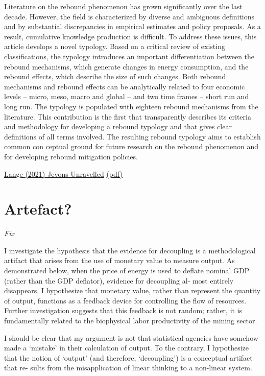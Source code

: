 \documentclass[
]{book}
\begin{document}
Literature on the rebound phenomenon has grown significantly over the last decade. However, the field is
characterized by diverse and ambiguous definitions and by substantial discrepancies in empirical estimates and
policy proposals. As a result, cumulative knowledge production is difficult. To address these issues, this article
develops a novel typology. Based on a critical review of existing classifications, the typology introduces an
important differentiation between the rebound mechanisms, which generate changes in energy consumption, and
the rebound effects, which describe the size of such changes. Both rebound mechanisms and rebound effects can
be analytically related to four economic levels -- micro, meso, macro and global -- and two time frames -- short run
and long run. The typology is populated with eighteen rebound mechanisms from the literature. This contribution
is the first that transparently describes its criteria and methodology for developing a rebound typology and that
gives clear definitions of all terms involved. The resulting rebound typology aims to establish common con­
ceptual ground for future research on the rebound phenomenon and for developing rebound mitigation policies.

\href{https://www.sciencedirect.com/science/article/pii/S221462962100075X}{Lange (2021) Jevons Unravelled}
\href{pdf/Lange_2021_Jevons_Unravelled.pdf}{(pdf)}

\hypertarget{artefact}{%
\section{Artefact?}\label{artefact}}

\emph{Fix}

I investigate the hypothesis that the evidence for
decoupling is a methodological artifact that arises from the use of monetary value
to measure output. As demonstrated below, when the price of energy is used to
deflate nominal GDP (rather than the GDP deflator), evidence for decoupling al-
most entirely disappears. I hypothesize that monetary value, rather than represent
the quantity of output, functions as a feedback device for controlling the flow of
resources. Further investigation suggests that this feedback is not random; rather, it
is fundamentally related to the biophysical labor productivity of the mining sector.

I should be clear that my argument is not that statistical agencies have somehow
made a `mistake' in their calculation of output. To the contrary, I hypothesize that
the notion of `output' (and therefore, `decoupling') is a conceptual artifact that re-
sults from the misapplication of linear thinking to a non-linear system.
\end{document}

